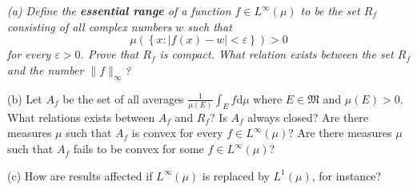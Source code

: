 \begin{problem}\em
(a) Define the \textbf{essential range} of a function $f\in L^\infty(\mu)$ to be the set $R_f$ consisting of all complex numbers $w$ such that 
$$
\mu \left( \left\{ x:\left| f\left( x \right) -w \right|<\varepsilon \right\} \right) >0
$$
for every $\varepsilon>0$. Prove that $R_f$ is compact. What relation exists between the set $R_f$ and the number $\|f\|_\infty$?\par
(b) Let $A_f$ be the set of all averages $\frac{1}{\mu(E)}\int_Ef\mathrm{d}\mu$ where $E\in\mathfrak{M}$ and $\mu(E)>0$. What relations exists between $A_f$ and $R_f$? Is $A_f$ always closed? Are there measures $\mu$ such that $A_f$ is convex for every $f\in L^\infty(\mu)$? Are there measures $\mu$ such that $A_f$ fails to be convex for some $f\in L^\infty(\mu)$?\par
(c) How are results affected if $L^\infty(\mu)$ is replaced by $L^1(\mu)$, for instance?
\end{problem}
